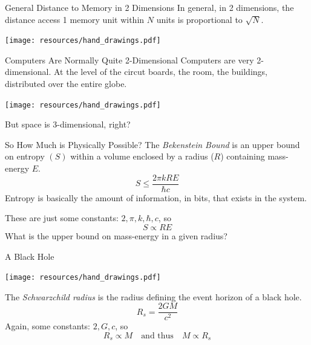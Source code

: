 \documentclass{beamer}
\begin{document}
\begin{frame}{General Distance to Memory in 2 Dimensions}
  In general, in 2 dimensions, the distance access 1 memory unit within $N$ units is proportional to $\sqrt{N}$.


\begin{center}
\texttt{[image: resources/hand\_drawings.pdf]}
\end{center}
\end{frame}

\begin{frame}{Computers Are Normally Quite 2-Dimensional}
Computers are very 2-dimensional. At the level of the circut boards, the room, the buildings, distributed over the entire globe.

\begin{center}
\texttt{[image: resources/hand\_drawings.pdf]}
\end{center}

\pause
\vspace{-1cm}
But space is 3-dimensional, right?
\end{frame}

\begin{frame}{So How Much is Physically Possible?}
The \emph{Bekenstein Bound} is an upper bound on entropy $(S)$ within a volume enclosed by a radius ($R$) containing mass-energy $E$.
\[
  S \leq \frac{2 \pi k R E}{\hbar c}
\]
Entropy is basically the amount of information, in bits, that exists in the system.
\pause

These are just some constants: $2, \pi, k, \hbar, c$, so
\[
  S \propto RE
\]
\pause
What is the upper bound on mass-energy in a given radius?
\end{frame}

\begin{frame}{A Black Hole}
\begin{center}
\texttt{[image: resources/hand\_drawings.pdf]}
\end{center}
\vspace{-0.5cm}

\pause
The \emph{Schwarzchild radius} is the radius defining the event horizon of a black hole.
\[
  R_s = \frac{2 G M}{c^2}
\]
\pause
Again, some constants: $2, G, c$, so
\[
  R_s \propto M \quad\text{and thus}\quad M\propto R_s
\]
\end{frame}
\end{document}
